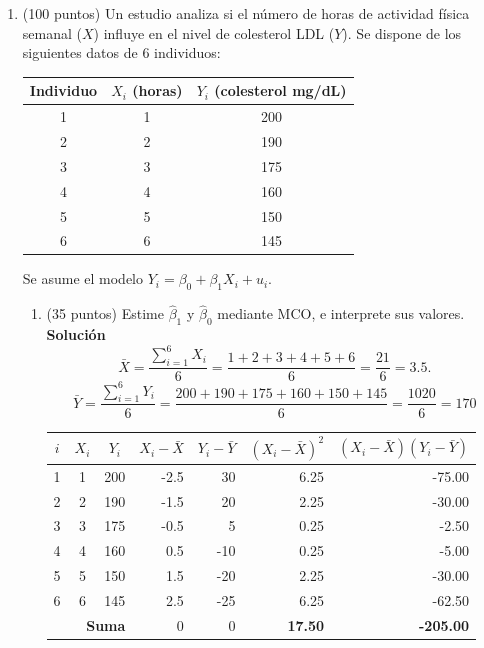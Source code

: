 \documentclass[10pt,a4paper]{article}
\begin{document}
 
\begin{enumerate}
    \item (100 puntos)
Un estudio analiza si el número de horas de actividad física semanal ($X$) influye en el nivel de colesterol LDL ($Y$). 
Se dispone de los siguientes datos de 6 individuos:

\begin{center}
\begin{tabular}{|c| c| c|}
\hline
Individuo & $X_i$ (horas) & $Y_i$ (colesterol mg/dL)\\
\hline
1 & 1 & 200\\
2 & 2 & 190\\
3 & 3 & 175\\
4 & 4 & 160\\
5 & 5 & 150\\
6 & 6 & 145\\
\hline
\end{tabular}
\end{center}

Se asume el modelo $Y_i=\beta_0+\beta_1 X_i+u_i$.

\begin{enumerate}

\item (35 puntos) Estime $\hat{\beta}_1$ y $\hat{\beta}_0$ mediante MCO, e interprete sus valores.
\\
\textbf{Solución}
\\
\[
\bar{X}=\frac{\sum_{i=1}^6 X_i}{6}
=\frac{1+2+3+4+5+6}{6}
=\frac{21}{6}
=3.5.
\]
\[
\bar{Y}=\frac{\sum_{i=1}^6 Y_i}{6}
=\frac{200+190+175+160+150+145}{6}
=\frac{1020}{6}
=170
\]

\begin{center}
\begin{tabular}{|c|c|c|r|r|r|r|}
\hline
$i$ & $X_i$ & $Y_i$ & $X_i-\bar X$ & $Y_i-\bar Y$ & $(X_i-\bar X)^2$ & $(X_i-\bar X)(Y_i-\bar Y)$ \\
\hline
1 & 1 & 200 & -2.5 & \phantom{-}30  & 6.25 & -75.00 \\
2 & 2 & 190 & -1.5 & \phantom{-}20  & 2.25 & -30.00 \\
3 & 3 & 175 & -0.5 & \phantom{-}\,5 & 0.25 & -2.50 \\
4 & 4 & 160 & \phantom{-}0.5 & -10 & 0.25 & -5.00 \\
5 & 5 & 150 & \phantom{-}1.5 & -20 & 2.25 & -30.00 \\
6 & 6 & 145 & \phantom{-}2.5 & -25 & 6.25 & -62.50 \\
\hline
\multicolumn{3}{|r|}{\textbf{Suma}} & 0 & 0 & \textbf{17.50} & \textbf{-205.00} \\
\hline
\end{tabular}
\end{center}


\end{enumerate}
\end{enumerate}
\end{document}
